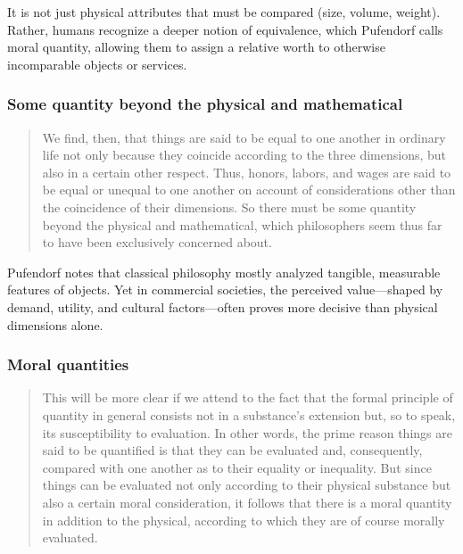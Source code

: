             It is not just physical attributes that must be compared (size, volume, weight). Rather, humans recognize a deeper notion of equivalence, which Pufendorf calls moral quantity, allowing them to assign a relative worth to otherwise incomparable objects or services.

        \subsubsection{Some quantity beyond the physical and mathematical}

            \begin{quote}
                We find, then, that things are said to be equal to one another in ordinary life not only because they coincide according to the three dimensions, but also in a certain other respect. Thus, honors, labors, and wages are said to be equal or unequal to one another on account of considerations other than the coincidence of their dimensions. So there must be some quantity beyond the physical and mathematical, which philosophers seem thus far to have been exclusively concerned about.
            \end{quote}

            Pufendorf notes that classical philosophy mostly analyzed tangible, measurable features of objects. Yet in commercial societies, the perceived value—shaped by demand, utility, and cultural factors—often proves more decisive than physical dimensions alone.

        \subsubsection{Moral quantities}

            \begin{quote}
                This will be more clear if we attend to the fact that the formal principle of quantity in general consists not in a substance’s extension but, so to speak, its susceptibility to evaluation. In other words, the prime reason things are said to be quantified is that they can be evaluated and, consequently, compared with one another as to their equality or inequality. But since things can be evaluated not only according to their physical substance but also a certain moral consideration, it follows that there is a moral quantity in addition to the physical, according to which they are of course morally evaluated.
            \end{quote}

